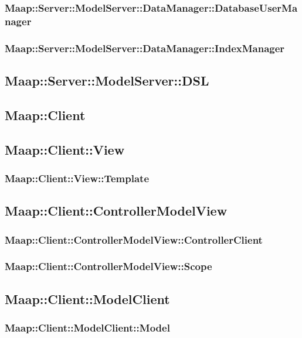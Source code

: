 \subsubsection{Maap::Server::ModelServer::DataManager::DatabaseUserManager}

\subsubsection{Maap::Server::ModelServer::DataManager::IndexManager}

\subsection{Maap::Server::ModelServer::DSL}

\subsection{Maap::Client}

\subsection{Maap::Client::View}

\subsubsection{Maap::Client::View::Template}

\subsection{Maap::Client::ControllerModelView}

\subsubsection{Maap::Client::ControllerModelView::ControllerClient}

\subsubsection{Maap::Client::ControllerModelView::Scope}

\subsection{Maap::Client::ModelClient}

\subsubsection{Maap::Client::ModelClient::Model}

